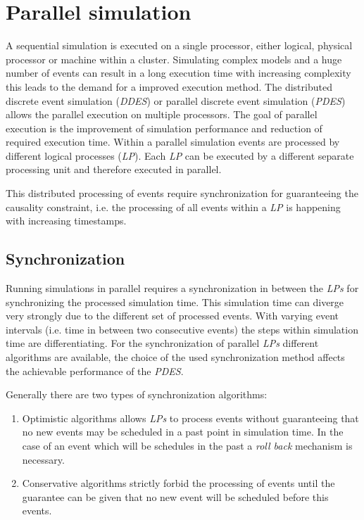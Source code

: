\chapter{Parallel simulation}
\label{cha:parallel_sim}
A sequential simulation is executed on a single processor, either logical, physical processor or machine within a cluster.
Simulating complex models and a huge number of events can result in a long execution time with increasing complexity this leads to the demand for a improved execution method.
The distributed discrete event simulation (\emph{DDES}) or parallel discrete event simulation (\emph{PDES}) allows the parallel execution on multiple processors.
The goal of parallel execution is the improvement of simulation performance and reduction of required execution time.
Within a parallel simulation events are processed by different logical processes (\emph{LP}).
Each \emph{LP} can be executed by a different separate processing unit and therefore executed in parallel. \cite{bagrodia_parsec:_1998}

This distributed processing of events require synchronization for guaranteeing the causality constraint, i.e. the processing of all events within a \emph{LP} is happening with increasing timestamps.

\section{Synchronization}
\label{sec:parallel_synchronization}
Running simulations in parallel requires a synchronization in between the \emph{LPs} for synchronizing the processed simulation time.
This simulation time can diverge very strongly due to the different set of processed events.
With varying event intervals (i.e. time in between two consecutive events) the steps within simulation time are differentiating.
For the synchronization of parallel \emph{LPs} different algorithms are available, the choice of the used synchronization method affects the achievable performance of the \emph{PDES}. \cite[chapter 2]{bagrodia_performance_2000}

Generally there are two types of synchronization algorithms:

\begin{enumerate}
    \item Optimistic algorithms allows \emph{LPs} to process events without guaranteeing that no new events may be scheduled in a past point in simulation time.
    In the case of an event which will be schedules in the past a \emph{roll back} mechanism is necessary.
    \item Conservative algorithms strictly forbid the processing of events until the guarantee can be given that no new event will be scheduled before this events.
\end{enumerate}

